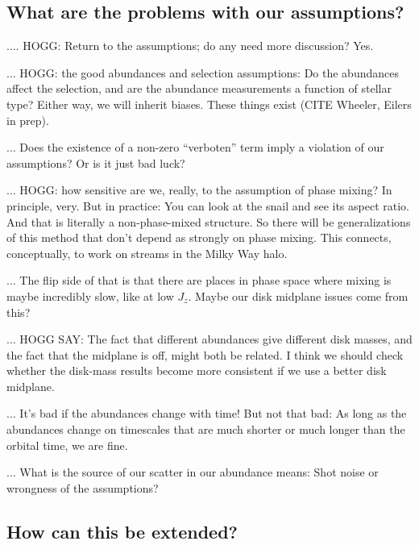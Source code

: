 \documentclass[modern]{aastex63}
\begin{document}
\subsection{What are the problems with our assumptions?}

.... HOGG: Return to the assumptions; do any need more discussion? Yes.

... HOGG: the good abundances and selection assumptions: Do the abundances affect
the selection, and are the abundance measurements a function of stellar type? Either way,
we will inherit biases. These things exist (CITE Wheeler, Eilers in prep).

... Does the existence of a non-zero ``verboten'' term imply a violation of our
assumptions?
Or is it just bad luck?

... HOGG: how sensitive are we, really, to the assumption of
phase mixing? In principle, very. But in practice: You can look at the
snail and see its aspect ratio. And that is literally a
non-phase-mixed structure. So there will be generalizations of this
method that don't depend as strongly on phase mixing. This connects,
conceptually, to work on streams in the Milky Way halo.

... The flip side of that is that there are places in phase space where
mixing is maybe incredibly slow, like at low $J_z$. Maybe our disk
midplane issues come from this?

... HOGG SAY: The fact that different abundances give
different disk masses, and the fact that the midplane is off, might
both be related. I think we should check whether the disk-mass results
become more consistent if we use a better disk midplane.

... It's bad if the abundances change with time! But not that bad: As
long as the abundances change on timescales that are much shorter or
much longer than the orbital time, we are fine.

... What is the source of our scatter in our abundance means: Shot noise
or wrongness of the assumptions?

\subsection{How can this be extended?}
\end{document}
